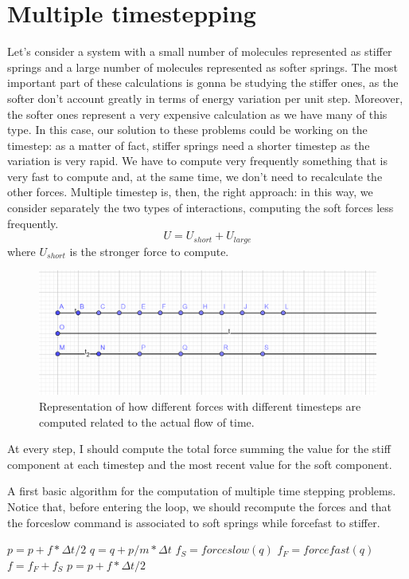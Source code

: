 \section{Multiple timestepping}\label{sec:multi_ts}
Let's consider a system with a small number of molecules represented as stiffer springs and a large number of molecules represented as softer springs. The most important part of these calculations is gonna be studying the stiffer ones, as the softer don't account greatly in terms of energy variation per unit step. Moreover, the softer ones represent a very expensive calculation as we have many of this type. In this case, our solution to these problems could be working on the timestep: as a matter of fact, stiffer springs need a shorter timestep as the variation is very rapid. We have to compute very frequently something that is very fast to compute and, at the same time, we don't need to recalculate the other forces. Multiple timestep is, then, the right approach: in this way, we consider separately the two types of interactions, computing the soft forces less frequently.
\begin{equation}
   U = U_{short}+U_{large}
\end{equation}
where $U_{short}$ is the stronger force to compute.
\begin{figure}
    \centering
    \includegraphics[width=1\textwidth]{Integrators/images/geogebra-export.png}
    \caption{Representation of how different forces with different timesteps are computed related to the actual flow of time.}
    \label{multiple_timestepping_img}
\end{figure}
At every step, I should compute the total force summing the value for the stiff component at each timestep and the most recent value for the soft component.
\begin{algorithm}[H]
            \caption{A first basic algorithm for the computation of multiple time stepping problems. Notice that, before entering the loop, we should recompute the forces and that the forceslow command is associated to soft springs while forcefast to stiffer.}
            \label{multiple_time_stepping_1}
			\begin{algorithmic}[1]
				\State $p=p+f*\Delta t/2$
				\State $q=q+p/m *\Delta t$
				    \State $f_S = forceslow(q)$ 
				\EndIf 
				\State $f_F = forcefast(q)$  
				\State $f = f_F + f_S$
				\State $p=p+f*\Delta t/2$	
				\EndFor
			\end{algorithmic}
\end{algorithm}
